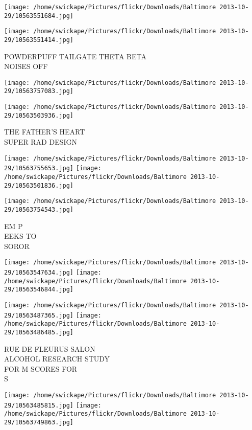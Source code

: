 \documentclass[10pt,letterpaper]{article}
\begin{document}
\texttt{[image: /home/swickape/Pictures/flickr/Downloads/Baltimore 2013-10-29/10563551684.jpg]}

\vspace{0.25in}
\texttt{[image: /home/swickape/Pictures/flickr/Downloads/Baltimore 2013-10-29/10563551414.jpg]}

POWDERPUFF TAILGATE THETA BETA\\
NOISES OFF\\
\pagebreak

\texttt{[image: /home/swickape/Pictures/flickr/Downloads/Baltimore 2013-10-29/10563757083.jpg]}

\vspace{0.25in}
\texttt{[image: /home/swickape/Pictures/flickr/Downloads/Baltimore 2013-10-29/10563503936.jpg]}

THE FATHER'S HEART\\
SUPER RAD DESIGN\\
\pagebreak

\texttt{[image: /home/swickape/Pictures/flickr/Downloads/Baltimore 2013-10-29/10563755653.jpg]}
\texttt{[image: /home/swickape/Pictures/flickr/Downloads/Baltimore 2013-10-29/10563501836.jpg]}

\vspace{0.25in}
\texttt{[image: /home/swickape/Pictures/flickr/Downloads/Baltimore 2013-10-29/10563754543.jpg]}

EM P\\
EEKS TO\\
SOROR\\
\pagebreak

\texttt{[image: /home/swickape/Pictures/flickr/Downloads/Baltimore 2013-10-29/10563547634.jpg]}
\texttt{[image: /home/swickape/Pictures/flickr/Downloads/Baltimore 2013-10-29/10563546844.jpg]}

\texttt{[image: /home/swickape/Pictures/flickr/Downloads/Baltimore 2013-10-29/10563487365.jpg]}
\texttt{[image: /home/swickape/Pictures/flickr/Downloads/Baltimore 2013-10-29/10563486485.jpg]}

RUE DE FLEURUS SALON\\
ALCOHOL RESEARCH STUDY\\
FOR M SCORES FOR\\
S\\
\pagebreak

\texttt{[image: /home/swickape/Pictures/flickr/Downloads/Baltimore 2013-10-29/10563485815.jpg]}
\texttt{[image: /home/swickape/Pictures/flickr/Downloads/Baltimore 2013-10-29/10563749863.jpg]}
\end{document}
